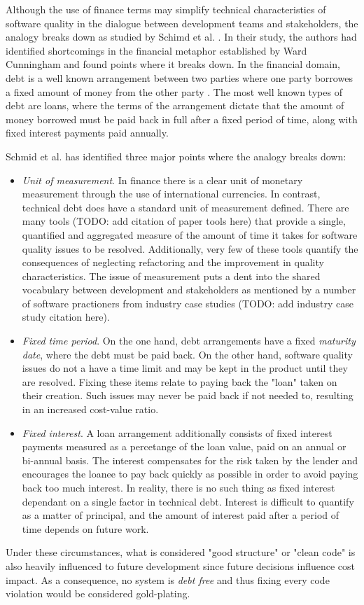 \documentclass{mprop}
\begin{document}
Although the use of finance terms may simplify technical characteristics of software quality in the dialogue between development teams and stakeholders, the analogy breaks down as studied by Schimd et al. \cite{Schmid2013}.
In their study, the authors had identified shortcomings in the financial metaphor established by Ward Cunningham \cite{Cunningham1993} and found points where it breaks down.
In the financial domain, debt is a well known arrangement between two parties where one party borrowes a fixed amount of money from the other party \cite{debt-investopedia}.
The most well known types of debt are loans, where the terms of the arrangement dictate that the amount of money borrowed must be paid back in full after a fixed period of time, along with fixed interest payments paid annually.

Schmid et al. \cite{Schmid2013} has identified three major points where the analogy breaks down:
\begin{itemize}
	\item \textit{Unit of measurement}. In finance there is a clear unit of monetary measurement through the use of international currencies.
	In contrast, technical debt does have a standard unit of measurement defined. 
	There are many tools (TODO: add citation of paper tools here) that provide a single, quantified and aggregated measure of the amount of time it takes for software quality issues to be resolved.
	Additionally, very few of these tools quantify the consequences of neglecting refactoring and the improvement in quality characteristics.
	The issue of measurement puts a dent into the shared vocabulary between development and stakeholders as mentioned by a number of software practioners from industry case studies (TODO: add industry case study citation here).
	\item \textit{Fixed time period}. On the one hand, debt arrangements have a fixed \textit{maturity date}, where the debt must be paid back.
	On the other hand, software quality issues do not a have a time limit and may be kept in the product until they are resolved.
	Fixing these items relate to paying back the "loan" taken on their creation.
	Such issues may never be paid back if not needed to, resulting in an increased cost-value ratio.
	\item \textit{Fixed interest}. A loan arrangement additionally consists of fixed interest payments measured as a percetange of the loan value, paid on an annual or bi-annual basis.
	The interest compensates for the risk taken by the lender and encourages the loanee to pay back quickly as possible in order to avoid paying back too much interest.
	In reality, there is no such thing as fixed interest dependant on a single factor in technical debt.
	Interest is difficult to quantify as a matter of principal, and the amount of interest paid after a period of time depends on future work.
\end{itemize}
Under these circumstances, what is considered "good structure" or "clean code" is also heavily influenced to future development since future decisions influence cost impact.
As a consequence, no system is \textit{debt free} and thus fixing every code violation would be considered gold-plating.
\end{document}
